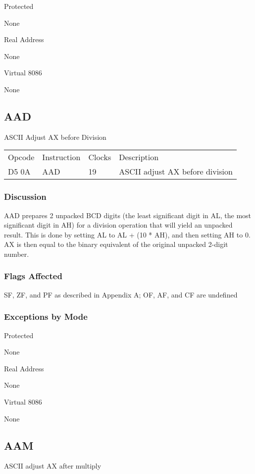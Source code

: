 Protected

None

Real Address

None

Virtual 8086

None

\subsection*{AAD} 

ASCII Adjust AX before Division 

\begin{tabular}{l l l l}
Opcode & Instruction & Clocks & Description\\
D5 0A & AAD & 19 & ASCII adjust AX before division\\
\end{tabular}

\subsubsection{Discussion}

AAD prepares 2 unpacked BCD digits (the least significant digit in AL, the most significant digit in AH) for a division operation that will yield an unpacked result. This is done by setting AL to AL + (10 * AH), and then setting AH to 0. AX is then equal to the binary equivalent of the original unpacked 2-digit number.

\subsubsection{Flags Affected}
SF, ZF, and PF as described in Appendix A; OF, AF, and CF are undefined

\subsubsection{Exceptions by Mode}

Protected

None

Real Address

None

Virtual 8086

None

\subsection*{AAM}

ASCII adjust AX after multiply

